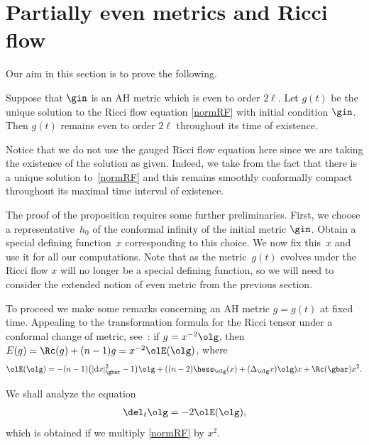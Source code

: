\section{Partially even metrics and Ricci flow} \label{PEandRF}

Our aim in this section is to prove the following.

\begin{Proposition} \label{prop:even-expansions-preserved}	Suppose that $\gin$ is an AH metric which is even to order $2\ell$. Let $g(t)$ be the unique solution to the Ricci flow	equation \eqref{normRF} with initial condition $\gin$. Then $g(t)$ remains even to order $2\ell$ throughout its time of existence.
\end{Proposition}

Notice that we do not use the gauged Ricci flow equation here since we are taking the existence of the solution as given. Indeed, we take from \cite{Bahuaud} the fact that there is a unique solution to~\eqref{normRF} and this remains smoothly conformally compact throughout its maximal time interval of existence.

The proof of the proposition requires some further preliminaries. First, we choose a representative~$h_0$ of the conformal infinity of the initial metric $\gin$. Obtain a special defining function~$x$ corresponding to this choice. We now fix this~$x$ and use it for all our computations. Note that as the metric~$g(t)$ evolves under the Ricci flow $x$ will no longer be a special defining function, so we will need to consider the extended notion of even metric from the previous section.

To proceed we make some remarks concerning an AH metric $g = g(t)$ at fixed time. Appealing to the transformation formula for the Ricci tensor under a conformal change of metric, see~\cite{Besse}:
if $g = x^{-2} \olg$, then $E(g) = \Rc(g) + (n-1)g = x^{-2} \olE(\olg)$, where
\begin{gather}\label{eq2.1}
\olE(\olg) = - (n-1) \big(|{\rm d}x|^2_{\gbar} -1\big) \olg + ( (n-2) \hess_{\olg} (x) + (\Delta_{\olg} x) \olg ) x + \Rc(\gbar) x^2 .
\end{gather}

We shall analyze the equation
\begin{gather}
\del_t \olg = -2 \olE( \olg),\label{rf1}
\end{gather}
which is obtained if we multiply \eqref{normRF} by $x^2$.

